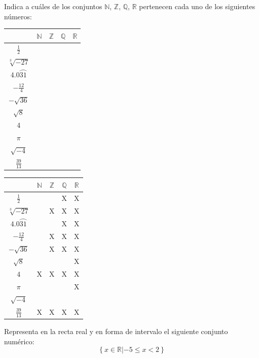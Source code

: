 \documentclass[addpoints,spanish, 12pt,a4paper]{exam}
\begin{document}
\begin{questions}

\question[2] Indica a cuáles de los conjuntos
$\mathbb{N}$, $\mathbb{Z}$, $\mathbb{Q}$, $\mathbb{R}$ pertenecen cada uno de los siguientes números:
\begin{center}
\begin{tabular}{|c |c |c |c |c|}\hline
&$\mathbb{N}$& $\mathbb{Z}$& $\mathbb{Q}$&$\mathbb{R}$\\ 
\hline
$\frac{1}{2}$&&&&\\
\hline
$\sqrt[3]{-27}$&&&&\\
\hline
$4.0\wideparen{31}$&&&&\\
\hline
$-\frac{12}{4}$&&&&\\
\hline
$-\sqrt{36}$&&&&\\
\hline
$\sqrt{8}$&&&&\\
\hline
$4$&&&&\\
\hline
$\pi$&&&&\\
\hline
$\sqrt{-4}$&&&&\\
\hline
$\frac{39}{13}$&&&&\\
\hline
\end{tabular}

\end{center}

\begin{solution}
\begin{tabular}{|c |c |c |c |c|}\hline
&$\mathbb{N}$& $\mathbb{Z}$& $\mathbb{Q}$&$\mathbb{R}$\\ 
\hline
$\frac{1}{2}$&&&X&X\\
\hline
$\sqrt[3]{-27}$&&X&X&X\\
\hline
$4.0\wideparen{31}$&&&X&X\\
\hline
$-\frac{12}{4}$&&X&X&X\\
\hline
$-\sqrt{36}$&&X&X&X\\
\hline
$\sqrt{8}$&&&&X\\
\hline
$4$&X&X&X&X\\
\hline
$\pi$&&&&X\\
\hline
$\sqrt{-4}$&&&&\\
\hline
$\frac{39}{13}$&X&X&X&X\\
\hline
\end{tabular}
\end{solution}

\addpoints

\question[1] Representa en la recta real y en forma de intervalo el siguiente conjunto numérico:
\addpoints %
$$\left\{ x \in \mathbb{R} \left| -5 \leqslant x < 2 \right. \right\}$$


\end{questions}
\end{document}
